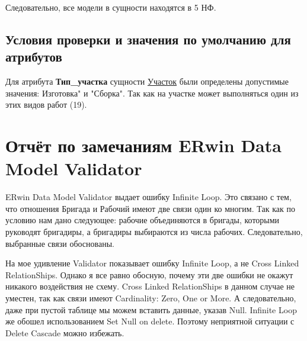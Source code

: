 Следовательно, все модели в сущности находятся в 5 НФ.

\subsection{Условия проверки и значения по умолчанию для атрибутов}

Для атрибута {\bf Тип\_участка} сущности \underline{Участок} были определены допустимые значения: Изготовка" и "Сборка".
Так как на участке может выполняться один из этих видов работ (19).

\section {Отчёт по замечаниям ERwin Data Model Validator}

ERwin Data Model Validator выдает ошибку Infinite Loop.
Это связано с тем, что отношения Бригада и Рабочий имеют две связи один ко многим.
Так как по условию нам дано следующее: рабочие объединяются в бригады, которыми руководят бригадиры, а бригадиры выбираются из числа рабочих.
Следовательно, выбранные связи обоснованы.

На мое удивление Validator показывает ошибку Infinite Loop, а не Cross Linked RelationShips.
Однако я все равно обосную, почему эти две ошибки не окажут никакого воздействия не схему.
Cross Linked RelationShips в данном случае не уместен, так как связи имеют Cardinality: Zero, One or More.
А следовательно, даже при пустой таблице мы можем вставить данные, указав Null.
Infinite Loop же обошел использованием Set Null on delete.
Поэтому неприятной ситуации с Delete Cascade можно избежать.

